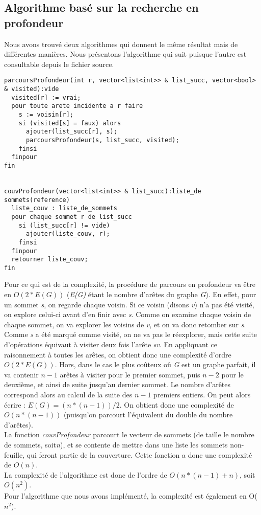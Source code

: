 \subsection{Algorithme bas\'e sur la recherche en profondeur}

Nous avons trouv\'e deux algorithmes qui donnent le m\^eme r\'esultat
mais de diff\'erentes mani\`eres. Nous pr\'esentons l'algorithme qui suit
puisque l'autre est consultable depuis le fichier source.

\begin{verbatim}
parcoursProfondeur(int r, vector<list<int>> & list_succ, vector<bool> & visited):vide
  visited[r] := vrai;
  pour toute arete incidente a r faire
    s := voisin[r];
    si (visited[s] = faux) alors
      ajouter(list_succ[r], s);
      parcoursProfondeur(s, list_succ, visited);
    finsi
  finpour
fin


couvProfondeur(vector<list<int>> & list_succ):liste_de sommets(reference)
  liste_couv : liste_de_sommets
  pour chaque sommet r de list_succ
    si (list_succ[r] != vide)
      ajouter(liste_couv, r);
    finsi
  finpour
  retourner liste_couv;
fin
\end{verbatim}

Pour ce qui est de la complexit\'e, la proc\'edure de parcours en profondeur va \^etre en \textit{$O(2*E(G))$} (\textit{E(G)} \'etant le nombre
d'ar\^etes du graphe \textit{G}). En effet, pour un sommet \textit{s}, on regarde chaque voisin. Si ce voisin (disons \textit{v}) n'a pas \'et\'e
visit\'e, on explore celui-ci avant d'en finir avec \textit{s}. Comme on examine chaque voisin de chaque sommet, on va explorer les
voisins de \textit{v}, et on va donc retomber sur \textit{s}. Comme \textit{s} a \'et\'e marqu\'e comme visit\'e, on ne va pas le r\'eexplorer,
mais cette suite d'op\'erations \'equivaut \`a visiter deux fois l'ar\^ete \textit{sv}. En appliquant ce raisonnement \`a toutes les ar\^etes,
on obtient donc une complexit\'e d'ordre \textit{$O(2*E(G))$}. Hors, dans le cas le plus co\^uteux o\^u \textit{G} est un graphe parfait,
il va contenir \textit{$n-1$} ar\^etes \`a visiter pour le premier sommet, puis \textit{$n-2$} pour le deuxi\`eme, et ainsi de suite jusqu'au
dernier sommet. Le nombre d'ar\^etes correspond alors au calcul de la suite des \textit{$n-1$} premiers entiers. On peut alors \'ecrire :
\textit{$ E(G) = ( n*(n-1)) / 2 $}. On obtient donc une complexit\'e de \textit{$O(n*(n-1))$} (puisqu'on parcourt l'\'equivalent du double
du nombre d'ar\^etes).\\

La fonction \textit{couvProfondeur} parcourt le vecteur de sommets (de taille le nombre de sommets, soit\textit{n}), et se contente de mettre
dans une liste les sommets non-feuille, qui feront partie de la couverture. Cette fonction a donc une complexit\'e de \textit{$O(n)$}.\\

La complexit\'e de l'algorithme est donc de l'ordre de \textit{$O( n*(n-1) + n )$}, soit \textit{$O(n^2)$}.\\

Pour l'algorithme que nous avons impl\'ement\'e, la complexit\'e est
\'egalement en O($n^{2}$).